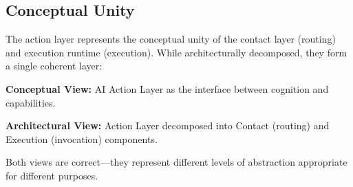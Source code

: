 \subsection{Conceptual Unity}

The action layer represents the conceptual unity of the contact layer (routing) and execution runtime (execution). While architecturally decomposed, they form a single coherent layer:

\textbf{Conceptual View:} AI Action Layer as the interface between cognition and capabilities.

\textbf{Architectural View:} Action Layer decomposed into Contact (routing) and Execution (invocation) components.

Both views are correct---they represent different levels of abstraction appropriate for different purposes.
